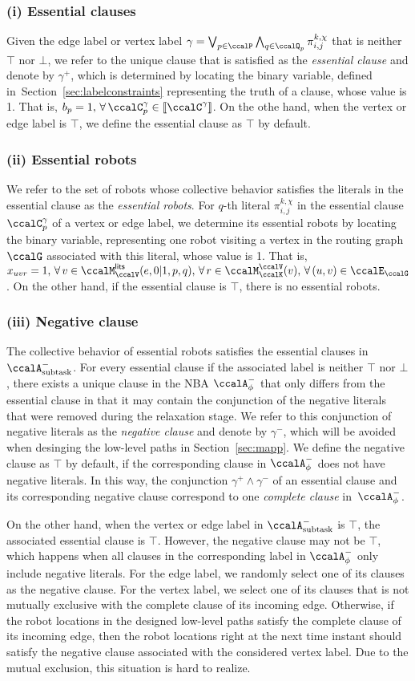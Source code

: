 \documentclass[journal]{IEEEtran}
\newcommand{\clause}[1]{\llbracket \ccalC^{#1} \rrbracket}
\newcommand{\auto}[1]{\ccalA_{\text{#1}}}
\newcommand{\autop}{\ccalA_{\phi}}
\renewcommand{\ap}[3]{\mathcal{\pi}_{{#1},{#2}}^{#3}}
\newcommand{\domanda}[1]{\subsubsection*{#1}}
\begin{document}
{{   \domanda{(i) Essential clauses} Given the edge label or vertex label $\gamma=\bigvee_{p\in \ccalP} \bigwedge_{q\in \ccalQ_p} \ap{i}{j}{k,\chi}$ that is neither $\top$ nor $\bot$, we refer to the unique clause that is satisfied as the {\it essential clause} and denote by $\gamma^+$, which is determined by locating the binary variable, defined in~Section~\ref{sec:labelconstraints} representing the truth of a clause, whose value is 1. That is, $b_p=1, \, \forall\, \ccalC_{p}^{\gamma} \in \clause{\gamma}$. On the othe hand, when the vertex or edge label is $\top$, we define the essential clause as $\top$ by default.
   \domanda{(ii) Essential robots} We refer to the set of robots whose collective behavior satisfies the literals in the essential clause as the {\it essential robots}. For $q$-th literal $\ap{i}{j}{k,\chi}$ in the essential clause $\ccalC_p^\gamma$ of a vertex or edge label, we determine its essential robots by locating the binary variable, representing one robot visiting a vertex in the routing graph $\ccalG$ associated with this literal, whose value is 1. That is, $x_{uvr}=1, \, \forall\, v\in \ccalM_{\ccalV}^\mathsf{lits} (e, 0|1, p, q),\,\forall\, r\in \ccalM_\ccalK^\ccalV(v), \,\forall\, (u,v)\in\ccalE_\ccalG$. On the other hand, if the essential clause is $\top$, there is no essential robots.
   \domanda{(iii) Negative clause} The collective behavior of essential robots satisfies the essential clauses in $\auto{subtask}^-$. For every essential clause if the associated label is neither $\top$ nor $\bot$, there exists a unique clause in the NBA $\autop^-$ that only differs from the essential clause in that it may contain the conjunction of the negative literals that were removed during the relaxation stage. We refer to this conjunction of negative literals  as the {\it negative clause} and denote by $\gamma^-$, which will be avoided when desinging the low-level paths in Section~\ref{sec:mapp}. We  define the negative clause as $\top$ by default, if the corresponding clause in $\autop^-$ does not have negative literals. In this way, the conjunction $\gamma^+ \wedge \gamma^-$ of an essential  clause and its corresponding negative clause correspond to  one {\it complete clause} in~$\autop^-$.

   On the other hand, when the vertex or edge label in $\auto{subtask}^-$ is $\top$, the associated essential clause is $\top$. However, the negative clause may not be $\top$, which happens when all clauses in the corresponding label in $\autop^-$ only include negative literals. For the edge label, we randomly select one of its clauses as the negative clause. For the vertex label, we select one of its clauses that is not mutually exclusive with the complete clause of its incoming edge. Otherwise, if the robot locations in the designed low-level paths  satisfy the complete clause of its incoming edge, then the robot locations right at the next time instant  should satisfy the negative clause associated with the considered vertex label. Due to the mutual exclusion,  this situation is hard to realize.}



}
\end{document}
